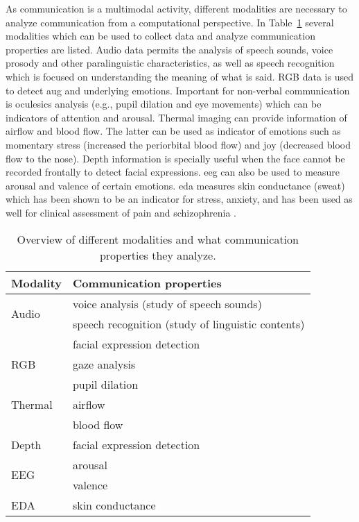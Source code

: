 As communication is a multimodal activity, different modalities are necessary to analyze communication from a computational perspective. In Table~\ref{tab:modality} several modalities which can be used to collect data and analyze communication properties are listed. Audio data permits the analysis of speech sounds, voice prosody and other paralinguistic characteristics, as well as speech recognition which is focused on understanding the meaning of what is said. RGB data is used to detect \gls{aug} and underlying emotions. Important for non-verbal communication is oculesics analysis (e.g., pupil dilation and eye movements) which can be indicators of attention and arousal. Thermal imaging can provide information of airflow and blood flow. The latter can be used as indicator of emotions such as momentary stress (increased the periorbital blood flow) and joy (decreased blood flow to the nose)\cite{Corneanu2016survey}. Depth information is specially useful when the face cannot be recorded frontally to detect facial expressions. \gls{eeg} can also be used to measure arousal and valence of certain emotions. \gls{eda} measures skin conductance (sweat) which has been shown to be an indicator for stress, anxiety, and has been used as well for clinical assessment of pain and schizophrenia \cite{Chen2015wavelet}.


\begin{table}
\centering
\caption{Overview of different modalities and what communication properties they analyze.}
\label{tab:modality}
\begin{tabular}{l|l}
\toprule
\textbf{Modality}      & \textbf{Communication properties}                 \\ \midrule
\multirow{2}{*}{Audio} & voice analysis (study of speech sounds)           \\
                       & speech recognition (study of linguistic contents) \\ \midrule
\multirow{3}{*}{RGB}   & facial expression detection                       \\
                       & gaze analysis                                     \\
                       & pupil dilation                                    \\ \midrule
Thermal                & airflow                                           \\
                       & blood flow                                        \\ \midrule
Depth                  & facial expression detection                       \\ \midrule
\multirow{2}{*}{EEG}   & arousal                                           \\
                       & valence                                           \\ \midrule
EDA                    & skin conductance                                 
\end{tabular}
\end{table}


